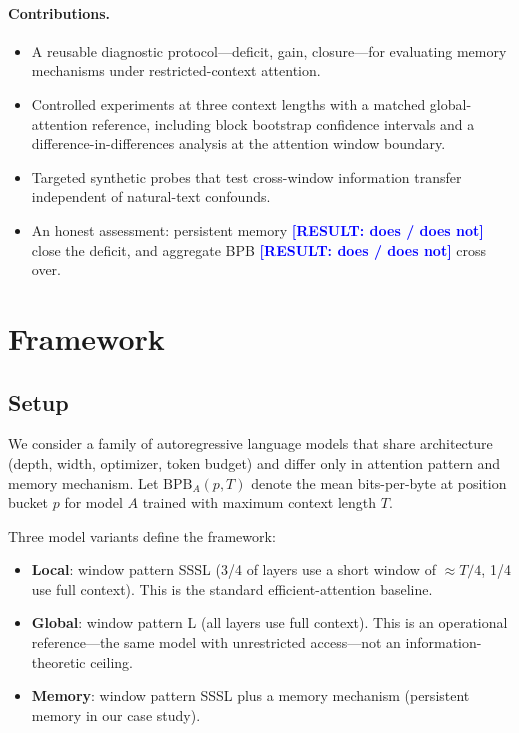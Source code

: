 \documentclass[11pt]{article}
\newcommand{\result}[1]{\textcolor{blue}{\textbf{[RESULT: #1]}}}
\newcommand{\bpb}{\mathrm{BPB}}
\begin{document}
\paragraph{Contributions.}
\begin{itemize}
\item A reusable diagnostic protocol---deficit, gain, closure---for
  evaluating memory mechanisms under restricted-context attention.
\item Controlled experiments at three context lengths with a matched
  global-attention reference, including block bootstrap confidence
  intervals and a difference-in-differences analysis at the attention
  window boundary.
\item Targeted synthetic probes that test cross-window information
  transfer independent of natural-text confounds.
\item An honest assessment: persistent memory
  \result{does / does not} close the deficit, and aggregate
  BPB \result{does / does not} cross over.
\end{itemize}


\section{Framework}
\label{sec:framework}

\subsection{Setup}

We consider a family of autoregressive language models that share
architecture (depth, width, optimizer, token budget) and differ only in
attention pattern and memory mechanism. Let $\bpb_A(p, T)$ denote the
mean bits-per-byte at position bucket $p$ for model $A$ trained with
maximum context length $T$.

Three model variants define the framework:
\begin{itemize}
\item \textbf{Local}: window pattern SSSL (3/4 of layers use a short
  window of $\approx T/4$, 1/4 use full context). This is the standard
  efficient-attention baseline.
\item \textbf{Global}: window pattern L (all layers use full context).
  This is an operational reference---the same model with unrestricted
  access---not an information-theoretic ceiling.
\item \textbf{Memory}: window pattern SSSL plus a memory mechanism
  (persistent memory in our case study).
\end{itemize}
\end{document}
